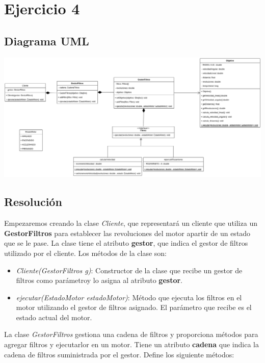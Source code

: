 \documentclass{article} %
\begin{document}
    \newpage

    \section{Ejercicio 4}
    \subsection{Diagrama UML}
    \includegraphics[width=\textwidth]{imagenes/Ej4_Practica1_DS.png}

    \subsection{Resolución}
    \hspace*{1cm}Empezaremos creando la clase \textit{Cliente}, que representará un cliente que utiliza un \textbf{GestorFiltros}
    para establecer las revoluciones del motor apartir de un estado que se le pase. La clase tiene el atributo \textbf{gestor}, que
    indica el gestor de filtros utilizado por el cliente.
    Los métodos de la clase son:

    \begin{itemize}
        \item \textit{Cliente(GestorFiltros g)}: Constructor de la clase que recibe un gestor de filtros como parámetroy lo asigna
                al atributo \textbf{gestor}.
        \item \textit{ejecutar(EstadoMotor estadoMotor)}: Método que ejecuta los filtros en el motor utilizando el gestor de filtros
                asignado. El parámetro que recibe es el estado actual del motor.
    \end{itemize}

    \hspace*{1cm}La clase \textit{GestorFiltros} gestiona una cadena de filtros y proporciona métodos para agregar filtros y ejecutarlor
    en un motor. Tiene un atributo \textbf{cadena} que indica la cadena de filtros suministrada por el gestor.
    Define los siguiente métodos:
\end{document}
